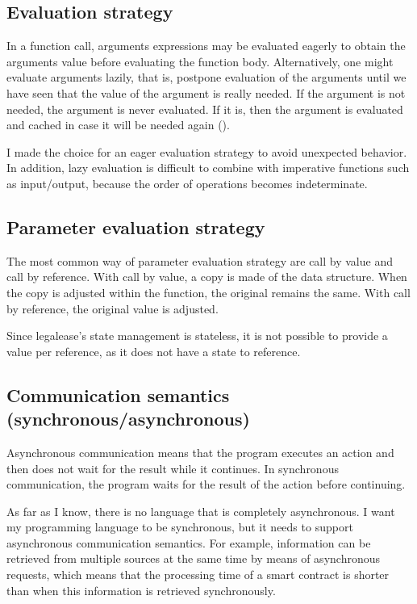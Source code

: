 \documentclass{uva-inf-article}
\begin{document}
\subsection{Evaluation strategy}
\par In a function call, arguments expressions may be evaluated eagerly 
to obtain the arguments value before evaluating the function body.
Alternatively, one might evaluate arguments lazily, that is, postpone evaluation 
of the arguments until we have seen that the value of the argument is really needed.
If the argument is not needed, the argument is never evaluated. If it is, 
then the argument is evaluated and cached in case it will be needed again
(\cite{Sestoft2012-2}).
\vspace{5mm}

\par I made the choice for an eager evaluation strategy to avoid unexpected behavior.
In addition, lazy evaluation is difficult to combine with imperative functions such as 
input/output, because the order of operations becomes indeterminate.

\subsection{Parameter evaluation strategy}
\par The most common way of parameter evaluation strategy are call by value and call by reference. 
With call by value, a copy is made of the data structure. When the copy is adjusted within the function, 
the original remains the same. With call by reference, the original value is adjusted.
\vspace{5mm}

\par Since legalease's state management is stateless, it is not possible to provide a value 
per reference, as it does not have a state to reference.

\subsection{Communication semantics (synchronous/asynchronous)}
\par Asynchronous communication means that the program executes an action and then does not wait for the result while it continues. 
In synchronous communication, the program waits for the result of the action before continuing.
\vspace{5mm}

As far as I know, there is no language that is completely asynchronous. 
I want my programming language to be synchronous, but it needs to support asynchronous communication semantics.
For example, information can be retrieved from multiple sources at the same time by means of asynchronous requests, 
which means that the processing time of a smart contract is shorter than when this information is retrieved synchronously.
\end{document}
